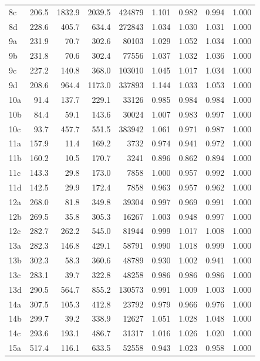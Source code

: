 \begin{center}
\begin{longtable}{@{}l@{\hspace{6pt}}rrrr@{\hspace{8pt}}rrrr@{}}
8c & 206.5 & 1832.9 & 2039.5 & 424879 & 1.101 & 0.982 & 0.994 & 1.000 \\
8d & 228.6 & 405.7 & 634.4 & 272843 & 1.034 & 1.030 & 1.031 & 1.000 \\
9a & 231.9 & 70.7 & 302.6 & 80103 & 1.029 & 1.052 & 1.034 & 1.000 \\
9b & 231.8 & 70.6 & 302.4 & 77556 & 1.037 & 1.032 & 1.036 & 1.000 \\
9c & 227.2 & 140.8 & 368.0 & 103010 & 1.045 & 1.017 & 1.034 & 1.000 \\
9d & 208.6 & 964.4 & 1173.0 & 337893 & 1.144 & 1.033 & 1.053 & 1.000 \\
10a & 91.4 & 137.7 & 229.1 & 33126 & 0.985 & 0.984 & 0.984 & 1.000 \\
10b & 84.4 & 59.1 & 143.6 & 30024 & 1.007 & 0.983 & 0.997 & 1.000 \\
10c & 93.7 & 457.7 & 551.5 & 383942 & 1.061 & 0.971 & 0.987 & 1.000 \\
11a & 157.9 & 11.4 & 169.2 & 3732 & 0.974 & 0.941 & 0.972 & 1.000 \\
11b & 160.2 & 10.5 & 170.7 & 3241 & 0.896 & 0.862 & 0.894 & 1.000 \\
11c & 143.3 & 29.8 & 173.0 & 7858 & 1.000 & 0.957 & 0.992 & 1.000 \\
11d & 142.5 & 29.9 & 172.4 & 7858 & 0.963 & 0.957 & 0.962 & 1.000 \\
12a & 268.0 & 81.8 & 349.8 & 39304 & 0.997 & 0.969 & 0.991 & 1.000 \\
12b & 269.5 & 35.8 & 305.3 & 16267 & 1.003 & 0.948 & 0.997 & 1.000 \\
12c & 282.7 & 262.2 & 545.0 & 81944 & 0.999 & 1.017 & 1.008 & 1.000 \\
13a & 282.3 & 146.8 & 429.1 & 58791 & 0.990 & 1.018 & 0.999 & 1.000 \\
13b & 302.3 & 58.3 & 360.6 & 48789 & 0.930 & 1.002 & 0.941 & 1.000 \\
13c & 283.1 & 39.7 & 322.8 & 48258 & 0.986 & 0.986 & 0.986 & 1.000 \\
13d & 290.5 & 564.7 & 855.2 & 130573 & 0.991 & 1.009 & 1.003 & 1.000 \\
14a & 307.5 & 105.3 & 412.8 & 23792 & 0.979 & 0.966 & 0.976 & 1.000 \\
14b & 299.7 & 39.2 & 338.9 & 12627 & 1.051 & 1.028 & 1.048 & 1.000 \\
14c & 293.6 & 193.1 & 486.7 & 31317 & 1.016 & 1.026 & 1.020 & 1.000 \\
15a & 517.4 & 116.1 & 633.5 & 52558 & 0.943 & 1.023 & 0.958 & 1.000 \\

\end{longtable}
\end{center}
